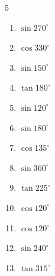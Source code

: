 \begin{multicols}{5}
\begin{enumerate}

  \item $\displaystyle \sin{270^\circ}$

        \phantom{$\displaystyle =-1$}

  \item $\displaystyle \cos{330^\circ}$


  \item $\displaystyle \sin{150^\circ}$


  \item $\displaystyle \tan{180^\circ}$

        \phantom{$\displaystyle =0$}

  \item $\displaystyle \sin{120^\circ}$


  \item $\displaystyle \sin{180^\circ}$

        \phantom{$\displaystyle =0$}

  \item $\displaystyle \cos{135^\circ}$


  \item $\displaystyle \sin{360^\circ}$

        \phantom{$\displaystyle =0$}

  \item $\displaystyle \tan{225^\circ}$

        \phantom{$\displaystyle =1$}

  \item $\displaystyle \cos{120^\circ}$


  \item $\displaystyle \cos{120^\circ}$


  \item $\displaystyle \sin{240^\circ}$


  \item $\displaystyle \tan{315^\circ}$


\end{enumerate}
\end{multicols}
